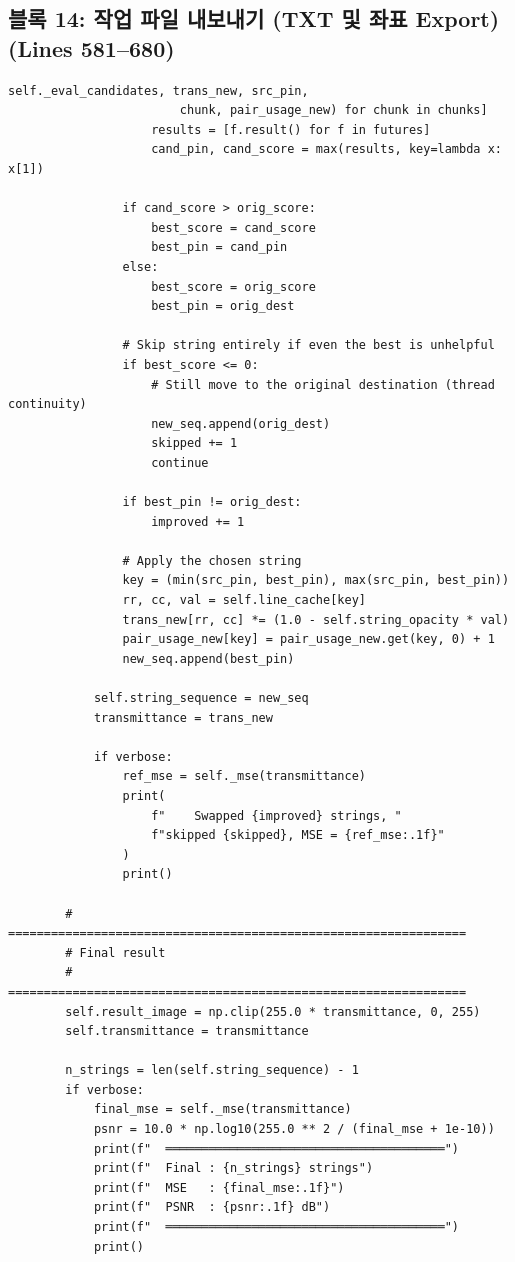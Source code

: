 \subsection*{블록 14: 작업 파일 내보내기 (TXT 및 좌표 Export) (Lines 581--680)}
\begin{lstlisting}[firstnumber=581]
                        self._eval_candidates, trans_new, src_pin,
                        chunk, pair_usage_new) for chunk in chunks]
                    results = [f.result() for f in futures]
                    cand_pin, cand_score = max(results, key=lambda x: x[1])

                if cand_score > orig_score:
                    best_score = cand_score
                    best_pin = cand_pin
                else:
                    best_score = orig_score
                    best_pin = orig_dest

                # Skip string entirely if even the best is unhelpful
                if best_score <= 0:
                    # Still move to the original destination (thread continuity)
                    new_seq.append(orig_dest)
                    skipped += 1
                    continue

                if best_pin != orig_dest:
                    improved += 1

                # Apply the chosen string
                key = (min(src_pin, best_pin), max(src_pin, best_pin))
                rr, cc, val = self.line_cache[key]
                trans_new[rr, cc] *= (1.0 - self.string_opacity * val)
                pair_usage_new[key] = pair_usage_new.get(key, 0) + 1
                new_seq.append(best_pin)

            self.string_sequence = new_seq
            transmittance = trans_new

            if verbose:
                ref_mse = self._mse(transmittance)
                print(
                    f"    Swapped {improved} strings, "
                    f"skipped {skipped}, MSE = {ref_mse:.1f}"
                )
                print()

        # ================================================================
        # Final result
        # ================================================================
        self.result_image = np.clip(255.0 * transmittance, 0, 255)
        self.transmittance = transmittance

        n_strings = len(self.string_sequence) - 1
        if verbose:
            final_mse = self._mse(transmittance)
            psnr = 10.0 * np.log10(255.0 ** 2 / (final_mse + 1e-10))
            print(f"  ═══════════════════════════════════════")
            print(f"  Final : {n_strings} strings")
            print(f"  MSE   : {final_mse:.1f}")
            print(f"  PSNR  : {psnr:.1f} dB")
            print(f"  ═══════════════════════════════════════")
            print()


\end{lstlisting}
